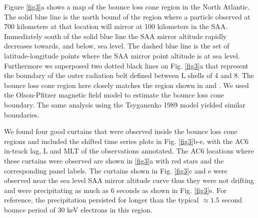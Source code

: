 \documentclass[draft]{agujournal2019}
\begin{document}
Figure \ref{fig3}a shows a map of the bounce loss cone region in the North Atlantic. The solid blue line is the north bound of the region where a particle observed at 700 kilometers at that location will mirror at 100 kilometers in the SAA. Immediately south of the solid blue line the SAA mirror altitude rapidly decreases towards, and below, sea level. The dashed blue line is the set of latitude-longitude points where the SAA mirror point altitude is at sea level. Furthermore we superposed two dotted black lines on Fig. \ref{fig3}a that represent the boundary of the outer radiation belt defined between L shells of 4 and 8. The bounce loss cone region here closely matches the region shown in  and . We used the Olson-Pfitzer magnetic field model \cite{Olson1982} to estimate the bounce loss cone boundary. The same analysis using the Tsyganenko 1989 model \cite{Tsyganenko1989} yielded similar boundaries. 

We found four good curtains that were observed inside the bounce loss cone regions and included the shifted time series plots in Fig. \ref{fig3}b-e, with the AC6 in-track lag, L and MLT of the observations annotated. The AC6 locations where these curtains were observed are shown in \ref{fig3}a with red stars and the corresponding panel labels. The curtains shown in Fig. \ref{fig3}c and e were observed near the sea level SAA mirror altitude curve thus they were not drifting and were precipitating as much as 6 seconds as shown in Fig. \ref{fig3}e. For reference, the precipitation persisted for longer than the typical $\approx 1.5$ second bounce period of 30 keV electrons in this region.
\end{document}
